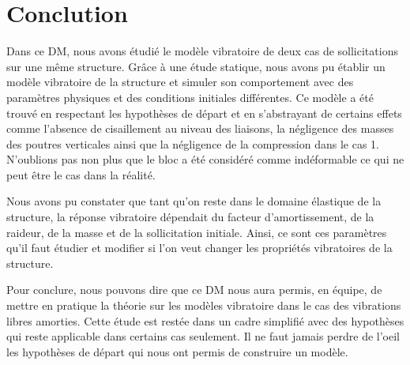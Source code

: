 \documentclass[a4paper,10pt]{report} %
\begin{document}
\chapter{Conclution}


Dans ce DM, nous avons étudié le modèle vibratoire de deux cas de sollicitations sur une même structure. Grâce à une étude statique, nous avons pu établir un modèle vibratoire de la structure et simuler son comportement avec des paramètres physiques et des conditions initiales différentes. Ce modèle a été trouvé en respectant les hypothèses de départ et en s'abstrayant de certains effets comme l'absence de cisaillement au niveau des liaisons, la négligence des masses des poutres verticales ainsi que la négligence de la compression dans le cas 1. N'oublions pas non plus que le bloc a été considéré comme indéformable ce qui ne peut être le cas dans la réalité.

Nous avons pu constater que tant qu'on reste dans le domaine élastique de la structure, la réponse vibratoire dépendait du facteur d'amortissement, de la raideur, de la masse et de la sollicitation initiale. Ainsi, ce sont ces paramètres qu'il faut étudier et modifier si l'on veut changer les propriétés vibratoires de la structure.

Pour conclure, nous pouvons dire que ce DM nous aura permis, en équipe, de mettre en pratique la théorie sur les modèles vibratoire dans le cas des vibrations libres amorties. Cette étude est restée dans un cadre simplifié avec des hypothèses qui reste applicable dans certains cas seulement. Il ne faut jamais perdre de l'oeil les hypothèses de départ qui nous ont permis de construire un modèle. 













%
%	
\end{document}
